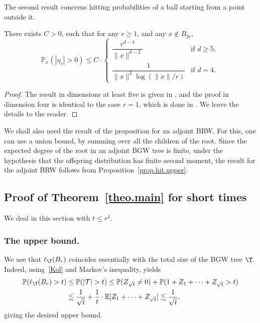 The second result concerns hitting probabilities of a ball starting from a point outside it.

\begin{proposition} \label{prop.hit.upper}
There exists $C>0$, such that for any $r\ge 1$, and any $x\notin B_{2r}$,
\begin{equation*}
\mathbb P_x(|\eta_r|>0) \le C\cdot
\begin{cases}
\dfrac{r^{d-4}}{\|x\|^{d-2}} & \text{if }d\ge 5, \\
\dfrac 1{\|x\|^2\log (\|x\|/r) }& \text{if }d=4.
\end{cases}
\end{equation*}
\end{proposition}
\begin{proof}
The result in dimensions at least five is given in \cite{Zhu1}, and the proof in dimension four is identical to the case $r=1$, which is done in \cite{Zhu4}.
We leave the details to the reader.
\end{proof}

\begin{remark}\label{rem.hit.adjoint}
We shall also need the result of the proposition for an adjoint BRW. For this, one can use a union bound, by summing over all the children of the root. Since the expected degree of the root in an adjoint BGW tree is finite, under the hypothesis that the offspring distribution has finite second moment, the result for the adjoint BRW follows from Proposition~\ref{prop.hit.upper}.
\end{remark}

\subsection{Proof of Theorem~\ref{theo.main} for short times}

We deal in this section with $t\le r^4$.

\subsubsection*{The upper bound.}
We use that $\ell_\T(B_r)$ coincides
essentially with the total size of the BGW tree $\T$.
Indeed, using~\eqref{Kol} and Markov's inequality, yields
\begin{align*}
\mathbb P(\ell_\T(B_r) > t) &
\le \mathbb P(|\mathbf{\mathcal T}|>t) \le \mathbb P(Z_{\sqrt t}\neq 0) + \mathbb P(1+Z_1+\dots + Z_{\sqrt t} > t) \\
&\lesssim \frac 1{\sqrt t} + \frac 1t \cdot \mathbb E[Z_1+\dots+ Z_{\sqrt t}] \lesssim \frac 1{\sqrt t},
\end{align*}
giving the desired upper bound.

